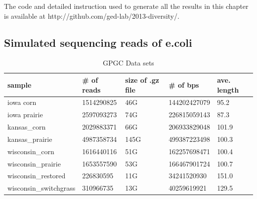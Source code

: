 The code and detailed instruction used to generate all the results in this 
chapter is available at
http://github.com/ged-lab/2013-diversity/. 


\subsection{Simulated sequencing reads of e.coli}




\begin{table}[h]
\caption{GPGC Data sets}
\label{my-label}
\begin{tabular}{|l|l|l|l|l|}
\hline
sample & \# of reads & size of .gz file & \# of bps & ave. length \\ \hline
iowa corn & 1514290825 & 46G & 144202427079 & 95.2 \\ \hline
iowa prairie & 2597093273 & 74G & 226815059143 & 87.3 \\ \hline
kansas\_corn & 2029883371 & 66G & 206933829048 & 101.9 \\ \hline
kansas\_prairie & 4987358734 & 145G & 499387223498 & 100.3 \\ \hline
wisconsin\_corn & 1616440116 & 51G & 162257698471 & 100.4 \\ \hline
wisconsin\_prairie & 1653557590 & 53G & 166467901724 & 100.7 \\ \hline
wisconsin\_restored & 226830595 & 11G & 34241520930 & 151.0 \\ \hline
wisconsin\_switchgrass & 310966735 & 13G & 40259619921 & 129.5 \\ \hline
\end{tabular}
\label{table:gpgc}
\end{table}

